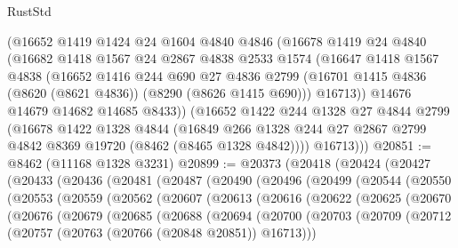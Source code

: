 \begin{lexlean}{RustStd}
\begin{coremodule}
      (@16652
        @1419
        @1424
        @24
        @1604
        @4840
        @4846
        (@16678
          @1419
          @24
          @4840
          (@16682
            @1418
            @1567
            @24
            @2867
            @4838
            @2533
            @1574
            (@16647
              @1418
              @1567
              @4838
              (@16652
                @1416
                @244
                @690
                @27
                @4836
                @2799
                (@16701 @1415 @4836 (@8620 (@8621 @4836)) (@8290 (@8626 @1415 @690)))
                @16713))
            @14676
            @14679
            @14682
            @14685
            @8433))
        (@16652
          @1422
          @244
          @1328
          @27
          @4844
          @2799
          (@16678
            @1422
            @1328
            @4844
            (@16849 @266 @1328 @244 @27 @2867 @2799 @4842 @8369 @19720 (@8462 (@8465 @1328 @4842))))
          @16713)))
@20851 := @8462 (@11168 @1328 @3231)
@20899 := @20373
    (@20418
      (@20424
        (@20427
          (@20433
            (@20436
              (@20481
                (@20487
                  (@20490
                    (@20496
                      (@20499
                        (@20544
                          (@20550
                            (@20553
                              (@20559
                                (@20562
                                  (@20607
                                    (@20613
                                      (@20616
                                        (@20622
                                          (@20625
                                            (@20670
                                              (@20676
                                                (@20679
                                                  (@20685
                                                    (@20688
                                                      (@20694
                                                        (@20700
                                                          (@20703
                                                            (@20709
                                                              (@20712
                                                                (@20757
                                                                  (@20763
                                                                    (@20766 (@20848 @20851))
                                                                    @16713)))

\end{coremodule}
\end{lexlean}
